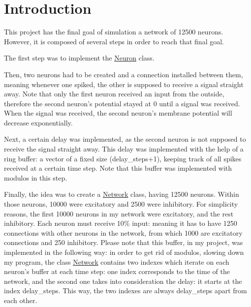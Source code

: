 \hypertarget{index_intro_sec}{}\section{Introduction}\label{index_intro_sec}
This project has the final goal of simulation a network of 12500 neurons. However, it is composed of several steps in order to reach that final goal.

The first step was to implement the \hyperlink{classNeuron}{Neuron} class.

Then, two neurons had to be created and a connection installed between them, meaning whenever one spiked, the other is supposed to receive a signal straight away. Note that only the first neuron received an input from the outside, therefore the second neuron's potential stayed at 0 until a signal was received. When the signal was received, the second neuron's membrane potential will decrease exponentially.

Next, a certain delay was implemented, as the second neuron is not supposed to receive the signal straight away. This delay was implemented with the help of a ring buffer\-: a vector of a fixed size (delay\-\_\-steps+1), keeping track of all spikes received at a certain time step. Note that this buffer was implemented with modulos in this step.

Finally, the idea was to create a \hyperlink{classNetwork}{Network} class, having 12500 neurons. Within those neurons, 10000 were excitatory and 2500 were inhibitory. For simplicity reasons, the first 10000 neurons in my network were excitatory, and the rest inhibitory. Each neuron must receive 10\% input\-: meaning it has to have 1250 connections with other neurons in the network, from which 1000 are excitatory connections and 250 inhibitory. Please note that this buffer, in my project, was implemented in the following way\-: in order to get rid of modulos, slowing down my program, the class \hyperlink{classNetwork}{Network} contains two indexes which iterate on each neuron's buffer at each time step\-: one index corresponds to the time of the network, and the second one takes into consideration the delay\-: it starts at the index delay\-\_\-steps. This way, the two indexes are always delay\-\_\-steps apart from each other. 